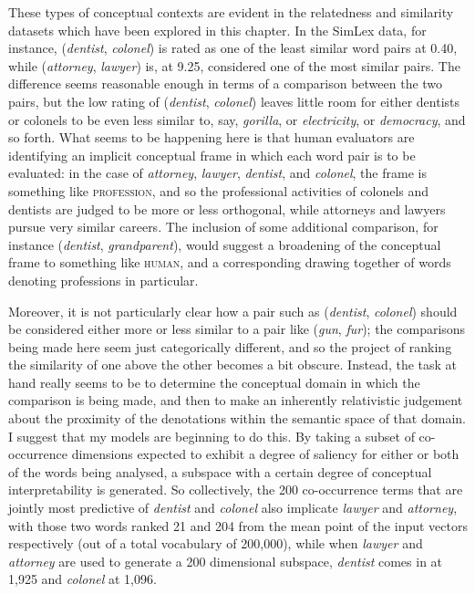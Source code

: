 These types of conceptual contexts are evident in the relatedness and similarity datasets which have been explored in this chapter.  In the SimLex data, for instance, (\emph{dentist}, \emph{colonel}) is rated as one of the least similar word pairs at 0.40, while (\emph{attorney}, \emph{lawyer}) is, at 9.25, considered one of the most similar pairs.  The difference seems reasonable enough in terms of a comparison between the two pairs, but the low rating of (\emph{dentist}, \emph{colonel}) leaves little room for either dentists or colonels to be even less similar to, say, \emph{gorilla}, or \emph{electricity}, or \emph{democracy}, and so forth.  What seems to be happening here is that human evaluators are identifying an implicit conceptual frame in which each word pair is to be evaluated: in the case of \emph{attorney}, \emph{lawyer}, \emph{dentist}, and \emph{colonel}, the frame is something like \textsc{profession}, and so the professional activities of colonels and dentists are judged to be more or less orthogonal, while attorneys and lawyers pursue very similar careers.  The inclusion of some additional comparison, for instance (\emph{dentist}, \emph{grandparent}), would suggest a broadening of the conceptual frame to something like \textsc{human}, and a corresponding drawing together of words denoting professions in particular.

Moreover, it is not particularly clear how a pair such as (\emph{dentist}, \emph{colonel}) should be considered either more or less similar to a pair like (\emph{gun}, \emph{fur}); the comparisons being made here seem just categorically different, and so the project of ranking the similarity of one above the other becomes a bit obscure.  Instead, the task at hand really seems to be to determine the conceptual domain in which the comparison is being made, and then to make an inherently relativistic judgement about the proximity of the denotations within the semantic space of that domain.  I suggest that my models are beginning to do this.  By taking a subset of co-occurrence dimensions expected to exhibit a degree of saliency for either or both of the words being analysed, a subspace with a certain degree of conceptual interpretability is generated.  So collectively, the 200 co-occurrence terms that are jointly most predictive of \emph{dentist} and \emph{colonel} also implicate \emph{lawyer} and \emph{attorney}, with those two words ranked 21 and 204 from the mean point of the input vectors respectively (out of a total vocabulary of 200,000), while when \emph{lawyer} and \emph{attorney} are used to generate a 200 dimensional subspace, \emph{dentist} comes in at 1,925 and \emph{colonel} at 1,096.


